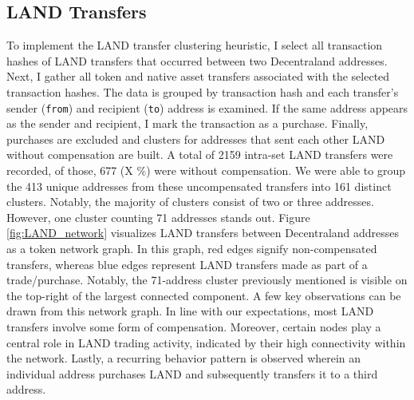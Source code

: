 \documentclass[12pt,a4paper,titlepage,oneside,english]{article}
\begin{document}
\subsection{LAND Transfers}
To implement the LAND transfer clustering heuristic, I select all transaction hashes of LAND transfers that occurred between two Decentraland addresses. Next, I gather all token and native asset transfers associated with the selected transaction hashes. The data is grouped by transaction hash and each transfer's sender (\texttt{from}) and recipient (\texttt{to}) address is examined. If the same address appears as the sender and recipient, I mark the transaction as a purchase. Finally, purchases are excluded and clusters for addresses that sent each other LAND without compensation are built. \newline
A total of 2159 intra-set LAND transfers were recorded, of those, 677 (X \%) were without compensation. We were able to group the 413 unique addresses from these uncompensated transfers into 161 distinct clusters. 
Notably, the majority of clusters consist of two or three addresses. However, one cluster counting 71 addresses stands out. \newline 
Figure \ref{fig:LAND_network} visualizes LAND transfers between Decentraland addresses as a token network graph. In this graph, red edges signify non-compensated transfers, whereas blue edges represent LAND transfers made as part of a trade/purchase. Notably, the 71-address cluster previously mentioned is visible on the top-right of the largest connected component. \newline
A few key observations can be drawn from this network graph. In line with our expectations, most LAND transfers involve some form of compensation. Moreover, certain nodes play a central role in LAND trading activity, indicated by their high connectivity within the network. Lastly, a recurring behavior pattern is observed wherein an individual address purchases LAND and subsequently transfers it to a third address.

\end{document}
